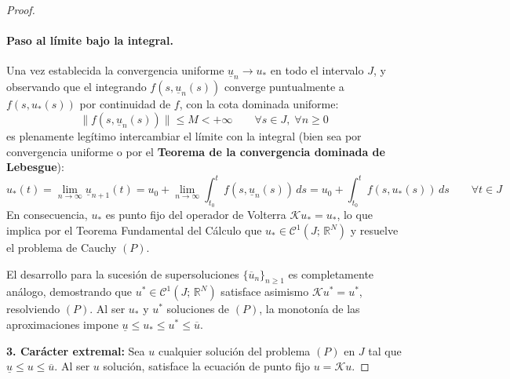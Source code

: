 \begin{proof}
\begin{center}
    \end{center}

    \paragraph{Paso al límite bajo la integral.}
    Una vez establecida la convergencia uniforme $\underline{u}_n \to u_*$ en todo el intervalo $J$, y observando que el integrando $f(s, \underline{u}_n(s))$ converge puntualmente a $f(s, u_*(s))$ por continuidad de $f$, con la cota dominada uniforme:
    \[
        \|f(s, \underline{u}_n(s))\| \leq M < +\infty \qquad \forall s \in J, \; \forall n \geq 0
    \]
    es plenamente legítimo intercambiar el límite con la integral (bien sea por convergencia uniforme o por el \textbf{Teorema de la convergencia dominada de Lebesgue}):
    \[
        u_*(t) = \lim_{n \to \infty} \underline{u}_{n+1}(t) = u_0 + \lim_{n \to \infty} \int_{t_0}^t f(s, \underline{u}_n(s)) \, ds = u_0 + \int_{t_0}^t f(s, u_*(s)) \, ds \qquad \forall t \in J
    \]
    En consecuencia, $u_*$ es punto fijo del operador de Volterra $\mathcal{K}u_* = u_*$, lo que implica por el Teorema Fundamental del Cálculo que $u_* \in \mathcal{C}^1(J; \, \mathbb{R}^N)$ y resuelve el problema de Cauchy $(P)$.

    El desarrollo para la sucesión de supersoluciones $\{\overline{u}_n\}_{n \geq 1}$ es completamente análogo, demostrando que $u^* \in \mathcal{C}^1(J; \, \mathbb{R}^N)$ satisface asimismo $\mathcal{K}u^* = u^*$, resolviendo $(P)$. Al ser $u_*$ y $u^*$ soluciones de $(P)$, la monotonía de las aproximaciones impone $\underline{u} \leq u_* \leq u^* \leq \overline{u}$.

    \medskip

    \textbf{3. Carácter extremal:}
    Sea $u$ cualquier solución del problema $(P)$ en $J$ tal que $\underline{u} \leq u \leq \overline{u}$. Al ser $u$ solución, satisface la ecuación de punto fijo $u = \mathcal{K}u$.
    

\end{proof}
